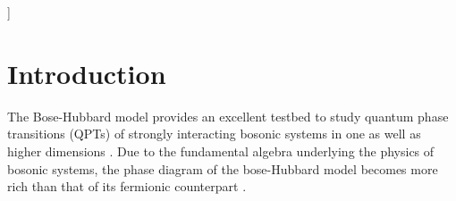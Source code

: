 \documentclass[twoside,twocolumn,9pt]{article}
\begin{document}
  ]

\renewcommand*\rmdefault{bch}\normalfont\upshape
\rmfamily
\section*{}
\vspace{-1cm}










\section{Introduction}

The Bose-Hubbard model provides an excellent testbed to study quantum phase transitions (QPTs) \cite{sachdev1999} of strongly interacting bosonic systems in one \cite{kuhner1998} as well as higher dimensions \cite{freericks1994}. Due to the fundamental algebra underlying the physics of bosonic systems, the phase diagram of the bose-Hubbard model becomes more rich than that of its fermionic counterpart \cite{gu2004, deng2006, cozzini2007, chung2021, devriendt2022}. 
\end{document}
